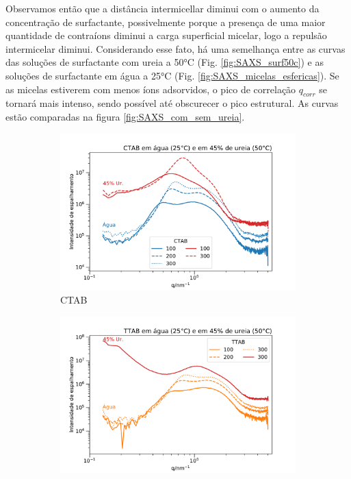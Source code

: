 	Observamos então que a distância intermicellar diminui com o aumento da concentração de surfactante, possivelmente porque a presença de uma maior quantidade de contraíons diminui a carga superficial micelar, logo a repulsão intermicelar diminui. Considerando esse fato, há uma semelhança entre as curvas das soluções de surfactante com ureia a 50°C (Fig. \ref{fig:SAXS_surf50c}) e as soluções de surfactante em água a 25°C (Fig. \ref{fig:SAXS_micelas_esfericas}). Se as micelas estiverem com menos íons adsorvidos, o pico de correlação $q_{corr}$ se tornará mais intenso, sendo possível até obscurecer o pico estrutural. As curvas estão comparadas na figura \ref{fig:SAXS_com_sem_ureia}.
	
	
	\begin{figure}[H]
		\begin{subfigure}[t]{0.45\textwidth}
			\centering
			\includegraphics[width=\textwidth]{./imagens/saxs/micelas_CTAB_agua_ureia}
			\caption{CTAB}
			\label{fig:SAXS_CTAB_com_sem_ureia}
		\end{subfigure} \qquad %
		\begin{subfigure}[t]{0.45\textwidth}
			\centering
			\includegraphics[width=\textwidth]{./imagens/saxs/micelas_TTAB_agua_ureia}

\end{subfigure}
\end{figure}
